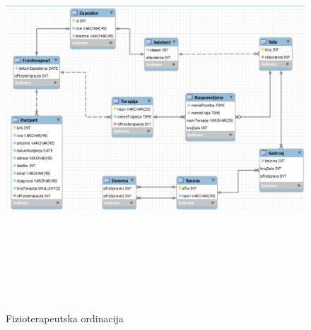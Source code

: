 \documentclass{article}
\begin{document}
\newpage
\begin{figure}[H]
	\centering
	\includegraphics[width=15cm,height=15cm,keepaspectratio]{EER.png}
	\caption{Fizioterapeutska ordinacija}
	\label{fig:dijagram}
\end{figure}
\end{document}
